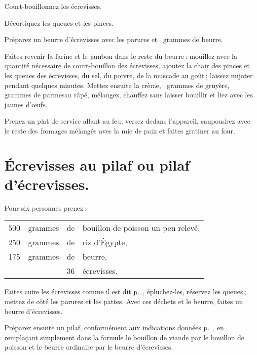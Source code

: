 Court-bouillonnez les écrevisses.

Décortiquez les queues et les pinces.

Préparez un beurre d'écrevisses avec les parures et {\mmm} grammes de beurre.

Faites revenir la farine et le jambon dans le reste du beurre ; mouillez avec
la quantité nécessaire de court-bouillon des écrevisses, ajoutez la chair des
pinces et les queues des écrevisses, du sel, du poivre, de la muscade au goût ;
laissez mijoter pendant quelques minutes. Mettez ensuite la crème, {\mmm} grammes
de gruyère, {\mmm} grammes de parmesan râpé, mélangez, chauffez sans laisser
bouillir et liez avec les jaunes d'œufs.

Prenez un plat de service allant au feu, versez dedans l'appareil, saupoudrez
avec le reste des fromages mélangés avec la mie de pain et faites gratiner au
four.

\section*{\centering Écrevisses au pilaf ou pilaf d’écrevisses.}

Pour six personnes prenez :

\medskip

\footnotesize
\begin{longtable}{rrrp{16em}}
  500 & grammes    & de & bouillon de poisson un peu relevé,                                              \\
  250 & grammes    & de & riz d'Égypte,                                                                   \\
  175 & grammes    & de & beurre,                                                                         \\
      &            & 36 & écrevisses.                                                                     \\
\end{longtable}
\normalsize

Faites cuire les écrevisses comme il est dit
\hyperlink{p0287}{p. \pageref{pg0287}}, épluchez-les, réservez les queues ; mettez
de côté les parures et les pattes. Avec ces déchets et le beurre, faites un
beurre d'écrevisses.

Préparez ensuite un pilaf, conformément aux indications données
\hyperlink{p0712}{p. \pageref{pg0712}}, en remplaçant simplement dans la formule
le bouillon de viande par le bouillon de poisson et le beurre ordinaire par le
beurre d’écrevisses.

